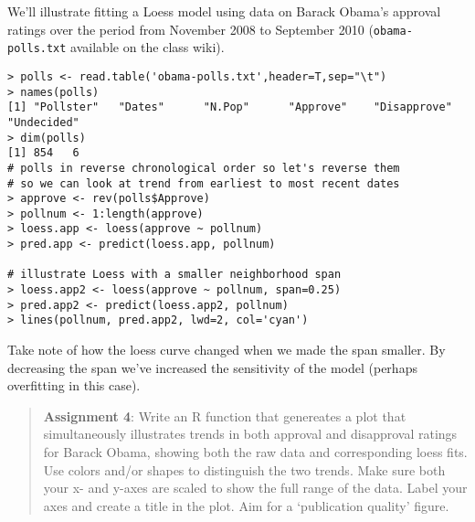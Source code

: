 We'll illustrate fitting a Loess model using data on Barack Obama's
approval ratings over the period from November 2008 to September 2010
(\lstinline!obama-polls.txt! available on the class wiki).

\begin{lstlisting}
> polls <- read.table('obama-polls.txt',header=T,sep="\t")
> names(polls)
[1] "Pollster"   "Dates"      "N.Pop"      "Approve"    "Disapprove" "Undecided" 
> dim(polls)
[1] 854   6    
# polls in reverse chronological order so let's reverse them
# so we can look at trend from earliest to most recent dates
> approve <- rev(polls$Approve)
> pollnum <- 1:length(approve)
> loess.app <- loess(approve ~ pollnum)
> pred.app <- predict(loess.app, pollnum)

# illustrate Loess with a smaller neighborhood span
> loess.app2 <- loess(approve ~ pollnum, span=0.25)
> pred.app2 <- predict(loess.app2, pollnum)
> lines(pollnum, pred.app2, lwd=2, col='cyan')
\end{lstlisting}
Take note of how the loess curve changed when we made the span smaller.
By decreasing the span we've increased the sensitivity of the model
(perhaps overfitting in this case).

\begin{quote}
\textbf{Assignment 4}: Write an R function that genereates a plot that
simultaneously illustrates trends in both approval and disapproval
ratings for Barack Obama, showing both the raw data and corresponding
loess fits. Use colors and/or shapes to distinguish the two trends. Make
sure both your x- and y-axes are scaled to show the full range of the
data. Label your axes and create a title in the plot. Aim for a
`publication quality' figure.

\end{quote}


